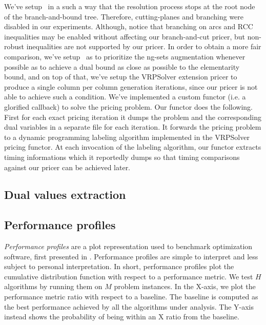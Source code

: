 We've setup \bapcod\ in a such a way that the resolution process stops at the root
node of the branch-and-bound tree.
Therefore, cutting-planes and branching were disabled in our experiments.
Although, notice that branching on arcs and RCC inequalities may be
enabled without affecting our branch-and-cut pricer, but non-robust
inequalities are not supported by our pricer.
In order to obtain a more fair comparison, we've setup \bapcod\ as to prioritize
the ng-sets augmentation whenever possible as to achieve a dual bound as close
as possible to the elementarity bound, and on top of that,
we've setup the VRPSolver extension pricer to produce a single column
per column generation iterations, since our pricer is not able to achieve
such a condition.
We've implemented a custom functor (i.e. a glorified callback) to solve the pricing problem.
Our functor does the following.
First for each exact pricing iteration it dumps the problem and the corresponding dual variables
in a separate file for each iteration.
It forwards the pricing problem to a dynamic programming labeling algorithm
implemented in the VRPSolver pricing functor.
At each invocation of the labeling algorithm, our functor extracts timing informations
which it reportedly dumps so that timing comparisons against our pricer can be achieved later.

%
%
%

\subsection{Dual values extraction}


\subsection{Performance profiles}
\label{sec:results-performance-profiles}

\textit{Performance profiles} are a plot representation used to benchmark optimization software,
first presented in \textcite{dolan2002}.
Performance profiles are simple to interpret and less subject to personal interpretation.
In short, performance profiles plot the cumulative distribution function with respect to a performance metric.
We test $H$ algorithms by running them on $M$ problem instances.
In the X-axis, we plot the performance metric ratio with respect to a baseline.
The baseline is computed as the best performance achieved by all the algorithms under analysis.
The Y-axis instead shows the probability of being within an X ratio from the baseline.

